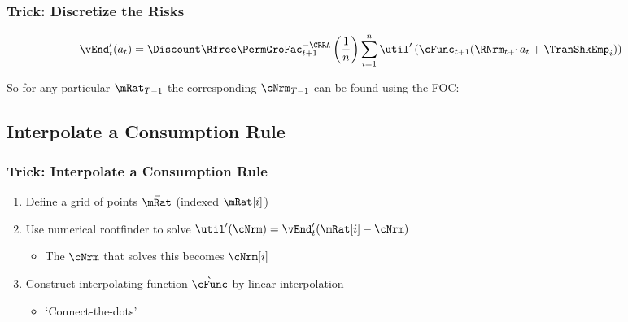 \documentclass{beamer}
\begin{document}
\begin{frame}[label=DiscretizeEqn]
\frametitle{Trick: Discretize the Risks}

\begin{equation}\begin{gathered}\begin{aligned}
        \vEnd_{t}^{\prime}({a}_{t})  & =  \Discount \Rfree \PermGroFac_{t+1}^{-\CRRA} \left(\frac{1}{n}\right) \sum_{i=1}^{n} \util^{\prime}\left(\cFunc_{t+1}(\RNrm_{t+1} {a}_{t} + \TranShkEmp_{i})\right)
\end{aligned}\end{gathered}\end{equation}

%

\pause 
So for any particular $\mRat_{T-1}$ the corresponding $\cNrm_{T-1}$ can be found
using the FOC:



\end{frame}
\subsection{Interpolate a Consumption Rule}
\begin{frame}
\frametitle{Trick: Interpolate a Consumption Rule}

\begin{enumerate}
\item Define a grid of points $\vec{\mRat}$ (indexed $\mRat[i]$)
\item Use numerical rootfinder to solve 
$\util^{\prime}(\cNrm) = \vEnd^{\prime}_{t}(\mRat[i]-\cNrm)$
\begin{itemize}
\item The $\cNrm$ that solves this becomes $\cNrm[i]$
\end{itemize}
\item Construct interpolating function $\grave{\cFunc}$ by linear interpolation
\begin{itemize}
\item `Connect-the-dots'
\end{itemize}
\end{enumerate}

\end{frame}
\end{document}
